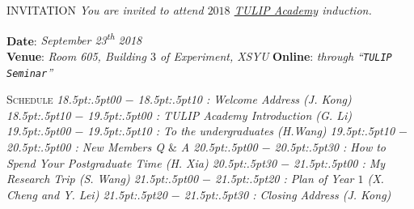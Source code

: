 \documentclass{article}
\begin{document}
%

\obeylines%

{ INVITATION}
\medbreak
\textit{%
  You are invited to attend $2018$ \href{http://www.tulip.org.au}{TULIP Academy} induction.
}


{\scshape }

\textbf{Date}:  \textit{September 23\/\rlap{,}\textsuperscript{th} 2018} \\ %
\textbf{Venue}: \textit{Room 605, Building $3$ of Experiment, XSYU}
\textbf{Online}: \textit{through ``\texttt{TULIP Seminar}''}

\smallbreak
{\scshape  Schedule}
\textit{%
\footnotesize{
  18\kern.5pt:\kern.5pt00 $-$ 18\kern.5pt:\kern.5pt10 : Welcome Address (J. Kong)
  18\kern.5pt:\kern.5pt10 $-$ 19\kern.5pt:\kern.5pt00 : TULIP Academy Introduction (G. Li)
  19\kern.5pt:\kern.5pt00 $-$ 19\kern.5pt:\kern.5pt10 : To the undergraduates (H.Wang)
  19\kern.5pt:\kern.5pt10 $-$ 20\kern.5pt:\kern.5pt00 : New Members Q $\&$ A
  20\kern.5pt:\kern.5pt00 $-$ 20\kern.5pt:\kern.5pt30 : How to Spend Your Postgraduate Time (H. Xia)
  20\kern.5pt:\kern.5pt30 $-$ 21\kern.5pt:\kern.5pt00 : My Research Trip (S. Wang)
  21\kern.5pt:\kern.5pt00 $-$ 21\kern.5pt:\kern.5pt20 : Plan of Year $1$ (X. Cheng and Y. Lei)
  21\kern.5pt:\kern.5pt20 $-$ 21\kern.5pt:\kern.5pt30 : Closing Address (J. Kong)}
}
\end{document}
